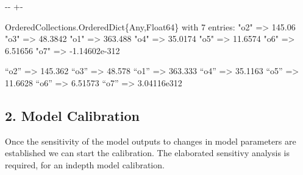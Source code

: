 \documentclass[a4paper,10pt,english]{sphinxmanual}
\newlength\nbsphinxcodecellspacing
\begin{document}
{

\kern-\sphinxverbatimsmallskipamount\kern-\baselineskip
\kern+\FrameHeightAdjust\kern-\fboxrule
\vspace{\nbsphinxcodecellspacing}

\begin{sphinxVerbatim}[commandchars=\\\{\}]
\llap{\color{nbsphinxout}[32]:\,\hspace{\fboxrule}\hspace{\fboxsep}}OrderedCollections.OrderedDict\{Any,Float64\} with 7 entries:
  "o2" => 145.06
  "o3" => 48.3842
  "o1" => 363.488
  "o4" => 35.0174
  "o5" => 11.6574
  "o6" => 6.51656
  "o7" => -1.14602e-312
\end{sphinxVerbatim}
}

\sphinxAtStartPar
“o2” =\textgreater{} 145.362 “o3” =\textgreater{} 48.578 “o1” =\textgreater{} 363.333 “o4” =\textgreater{} 35.1163 “o5” =\textgreater{} 11.6628 “o6” =\textgreater{} 6.51573 “o7” =\textgreater{} 3.04116e\sphinxhyphen{}312


\subsection{2. Model Calibration}
\label{\detokenize{jupyter_notebook/parameter-calibration:2.-Model-Calibration}}
\sphinxAtStartPar
Once the sensitivity of the model outputs to changes in model parameters are established we can start the calibration. The elaborated sensitivy analysis is required, for an in\sphinxhyphen{}depth model calibration.

{
\begin{sphinxVerbatim}[commandchars=\\\{\}]
\llap{\color{nbsphinxin}[34]:\,\hspace{\fboxrule}\hspace{\fboxsep}}   
\end{sphinxVerbatim}
}
\end{document}
